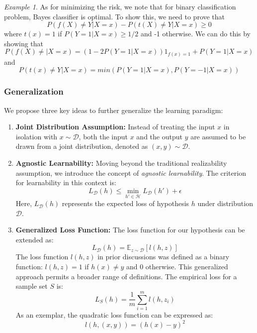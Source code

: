 \documentclass{article}
\theoremstyle{remark}
\newtheorem{example}{Example}
\begin{document}
    \begin{example}
    As for minimizing the risk, we note that for binary classification problem, Bayes classifier is optimal. To show this, we need to prove that $$P(f(X)\neq Y\vert X=x)-P(t(X)\neq Y\vert X=x)\geq 0$$ where $t(x)=1$ if $P(Y=1\vert X=x)\geq 1/2$ and -1 otherwise. We can 
    do this by showing that $$P(f(X)\neq\vert X=x)=(1-2P(Y=1\vert X=x))1_{f(x)=1}+P(Y=1\vert X=x)$$ and $$P(t(x)\neq Y\vert X=x)=min(P(Y=1\vert X=x), P(Y=-1\vert X=x))$$


    \end{example}
    \subsubsection*{Generalization}

    We propose three key ideas to further generalize the learning paradigm:
    
    \begin{enumerate}
        \item \textbf{Joint Distribution Assumption:} 
        Instead of treating the input \(x\) in isolation with \(x \sim \mathcal{D}\), both the input \(x\) and the output \(y\) are assumed to be drawn from a joint distribution, denoted as \((x,y) \sim \mathcal{D}\).
    
        \item \textbf{Agnostic Learnability:}
        Moving beyond the traditional realizability assumption, we introduce the concept of \textit{agnostic learnability}. The criterion for learnability in this context is:
        \[
        L_\mathcal{D}(h) \leq \min_{h' \in \mathcal{H}} L_\mathcal{D}(h') + \epsilon
        \]
        Here, \(L_\mathcal{D}(h)\) represents the expected loss of hypothesis \(h\) under distribution \(\mathcal{D}\).
    
        \item \textbf{Generalized Loss Function:}
        The loss function for our hypothesis can be extended as:
        \[
        L_\mathcal{D}(h) = \mathbb{E}_{z \sim \mathcal{D}} [l(h, z)]
        \]
        The loss function \(l(h,z)\) in prior discussions was defined as a binary function: \(l(h,z) = 1\) if \(h(x) \neq y\) and \(0\) otherwise. This generalized approach permits a broader range of definitions. The empirical loss for a sample set \(S\) is:
        \[
        L_S(h) = \frac{1}{m} \sum_{i=1}^{m} l(h, z_i)
        \]
        As an exemplar, the quadratic loss function can be expressed as:
        \[
        l(h, (x,y)) = (h(x) - y)^2
        \]
    \end{enumerate}
    
\end{document}
